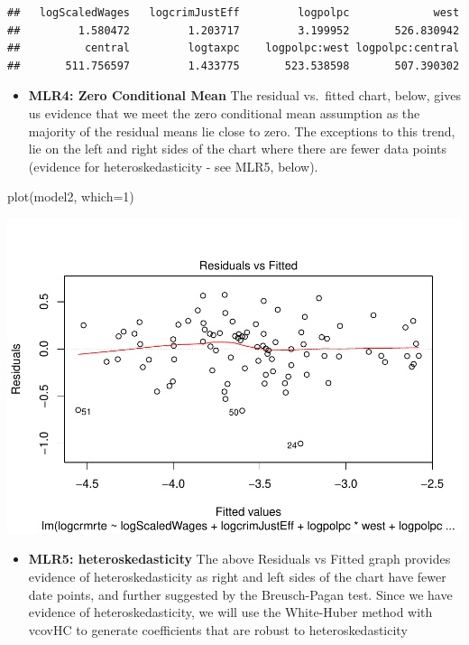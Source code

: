 \documentclass[]{article}
\newenvironment{Shaded}{}{}
\newcommand{\DataTypeTok}[1]{#1}
\newcommand{\DecValTok}[1]{#1}
\newcommand{\KeywordTok}[1]{\textcolor[rgb]{0.00,0.00,1.00}{#1}}
\newcommand{\NormalTok}[1]{#1}
\providecommand{\tightlist}{%
  \setlength{\itemsep}{0pt}\setlength{\parskip}{0pt}}
\begin{document}
\begin{verbatim}
##   logScaledWages   logcrimJustEff         logpolpc             west 
##         1.580472         1.203717         3.199952       526.830942 
##          central         logtaxpc    logpolpc:west logpolpc:central 
##       511.756597         1.433775       523.538598       507.390302
\end{verbatim}

\begin{itemize}
\tightlist
\item
  \textbf{MLR4: Zero Conditional Mean} The residual vs.~fitted chart,
  below, gives us evidence that we meet the zero conditional mean
  assumption as the majority of the residual means lie close to zero.
  The exceptions to this trend, lie on the left and right sides of the
  chart where there are fewer data points (evidence for
  heteroskedasticity - see MLR5, below).
\end{itemize}

\begin{Shaded}
\begin{Highlighting}[]
\KeywordTok{plot}\NormalTok{(model2, }\DataTypeTok{which=}\DecValTok{1}\NormalTok{)}
\end{Highlighting}
\end{Shaded}

\includegraphics{Bagnard_Gaustad_Hartman_Leung_Lab_3_files/figure-latex/unnamed-chunk-72-1.pdf}

\begin{itemize}
\tightlist
\item
  \textbf{MLR5: heteroskedasticity} The above Residuals vs Fitted graph
  provides evidence of heteroskedasticity as right and left sides of the
  chart have fewer date points, and further suggested by the
  Breusch-Pagan test. Since we have evidence of heteroskedasticity, we
  will use the White-Huber method with vcovHC to generate coefficients
  that are robust to heteroskedasticity
\end{itemize}
\end{document}
